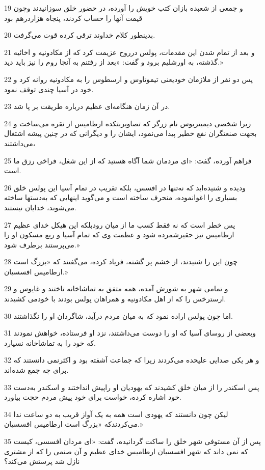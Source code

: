 \par 19 و جمعی از شعبده بازان کتب خویش را آورده، در حضور خلق سوزانیدند وچون قیمت آنها را حساب کردند، پنجاه هزاردرهم بود
\par 20 بدینطور کلام خداوند ترقی کرده قوت می‌گرفت.
\par 21 و بعد از تمام شدن این مقدمات، پولس درروح عزیمت کرد که از مکادونیه و اخائیه گذشته، به اورشلیم برود و گفت: «بعد از رفتنم به آنجا روم را نیز باید دید.»
\par 22 پس دو نفر از ملازمان خودیعنی تیموتاوس و ارسطوس را به مکادونیه روانه کرد و خود در آسیا چندی توقف نمود.
\par 23 در آن زمان هنگامه‌ای عظیم درباره طریقت بر پا شد.
\par 24 زیرا شخصی دیمیتریوس نام زرگر که تصاویربتکده ارطامیس از نقره می‌ساخت و بجهت صنعتگران نفع خطیر پیدا می‌نمود، ایشان را و دیگرانی که در چنین پیشه اشتغال می‌داشتند،
\par 25 فراهم آورده، گفت: «ای مردمان شما آگاه هستید که از این شغل، فراخی رزق ما است.
\par 26 ودیده و شنیده‌اید که نه‌تنها در افسس، بلکه تقریب در تمام آسیا این پولس خلق بسیاری را اغوانموده، منحرف ساخته است و می‌گوید اینهایی که به‌دستها ساخته می‌شوند، خدایان نیستند.
\par 27 پس خطر است که نه فقط کسب ما از میان رودبلکه این هیکل خدای عظیم ارطامیس نیز حقیرشمرده شود و عظمت وی که تمام آسیا و ربع مسکون او را می‌پرستند برطرف شود.»
\par 28 چون این را شنیدند، از خشم پر گشته، فریاد کرده، می‌گفتند که «بزرگ است ارطامیس افسسیان.»
\par 29 و تمامی شهر به شورش آمده، همه متفق به تماشاخانه تاختند و غایوس و ارسترخس را که از اهل مکادونیه و همراهان پولس بودند با خودمی کشیدند.
\par 30 اما چون پولس اراده نمود که به میان مردم درآید، شاگردان او را نگذاشتند.
\par 31 وبعضی از روسای آسیا که او را دوست می‌داشتند، نزد او فرستاده، خواهش نمودند که خود را به تماشاخانه نسپارد.
\par 32 و هر یکی صدایی علیحده می‌کردند زیرا که جماعت آشفته بود و اکثرنمی دانستند که برای چه جمع شده‌اند.
\par 33 پس اسکندر را از میان خلق کشیدند که یهودیان او راپیش انداختند و اسکندر به‌دست خود اشاره کرده، خواست برای خود پیش مردم حجت بیاورد.
\par 34 لیکن چون دانستند که یهودی است همه به یک آواز قریب به دو ساعت ندا می‌کردندکه «بزرگ است ارطامیس افسسیان.»
\par 35 پس از آن مستوفی شهر خلق را ساکت گردانیده، گفت: «ای مردان افسسی، کیست که نمی داند که شهر افسسیان ارطامیس خدای عظیم و آن صنمی را که از مشتری نازل شد پرستش می‌کند؟
